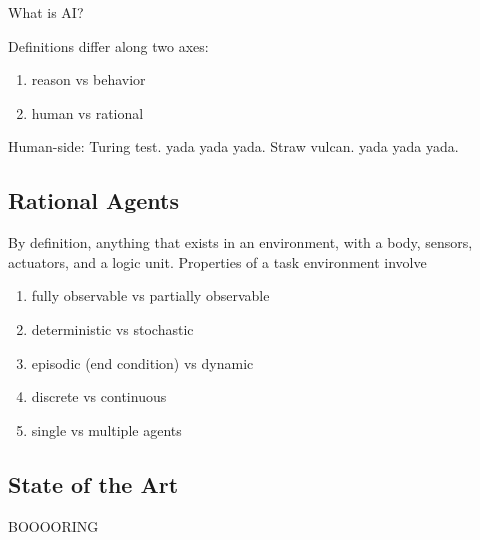 \documentclass[12pt]{article}
\begin{document}
What is AI?

Definitions differ along two axes:
\begin{enumerate}
    \item reason vs behavior
    \item human vs rational
\end{enumerate}

Human-side: Turing test. yada yada yada. Straw vulcan. yada yada yada.





\subsection{Rational Agents}
By definition, anything that exists in an environment, with a body, sensors, actuators, and a logic unit.
Properties of a task environment involve
\begin{enumerate}
    \item fully observable vs partially observable
    \item deterministic vs stochastic
    \item episodic (end condition) vs dynamic
    \item discrete vs continuous
    \item single vs multiple agents
\end{enumerate}

\subsection{State of the Art}
BOOOORING
\end{document}

